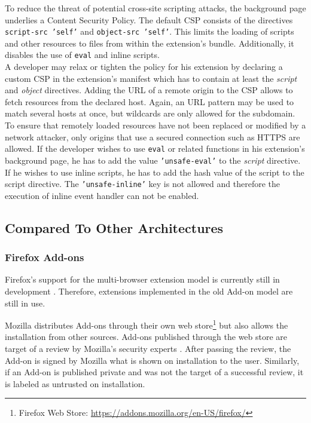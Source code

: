 	To reduce the threat of potential cross-site scripting attacks, the background page underlies a Content Security Policy. The default CSP consists of the directives \texttt{script-src 'self'} and \texttt{object-src 'self'}. This limits the loading of scripts and other resources to files from within the extension's bundle. Additionally, it disables the use of \texttt{eval} and inline scripts.  \\
	A developer may relax or tighten the policy for his extension by declaring a custom CSP in the extension's manifest which has to contain at least the \textit{script} and \textit{object} directives. Adding the URL of a remote origin to the CSP allows to fetch resources from the declared host. Again, an URL pattern may be used to match several hosts at once, but wildcards are only allowed for the subdomain. To ensure that remotely loaded resources have not been replaced or modified by a network attacker, only origins that use a secured connection such as HTTPS are allowed. If the developer wishes to use \texttt{eval} or related functions in his extension's background page, he has to add the value \texttt{'unsafe-eval'} to the \textit{script} directive. If he wishes to use inline scripts, he has to add the hash value of the script to the script directive. The \texttt{'unsafe-inline'} key is not allowed and therefore the execution of inline event handler can not be enabled.

\subsection{Compared To Other Architectures}

	

\subsubsection{Firefox Add-ons}
	
	Firefox's support for the multi-browser extension model is currently still in development \cite{mozillaWebExtensionStatus}. Therefore, extensions implemented in the old Add-on model are still in use. 
	
	Mozilla distributes Add-ons through their own web store\footnote{Firefox Web Store: \url{https://addons.mozilla.org/en-US/firefox/}} but also allows the installation from other sources. Add-ons published through the web store are target of a review by Mozilla's security experts \cite{mozillaDevReviewPolicy}. After passing the review, the Add-on is signed by Mozilla what is shown on installation to the user. Similarly, if an Add-on is published private and was not the target of a successful review, it is labeled as untrusted on installation. 
	
